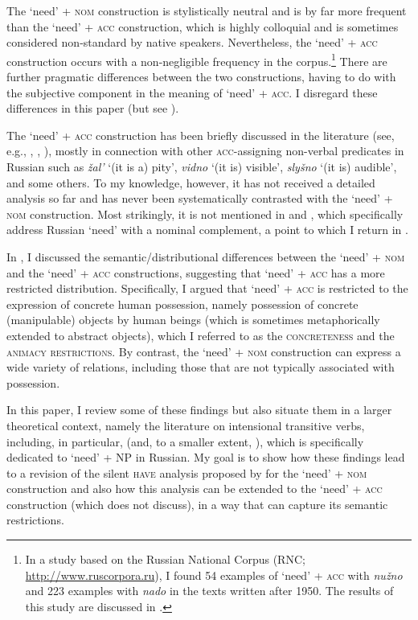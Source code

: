 \documentclass[output=paper,colorlinks,citecolor=brown]{langscibook}
\begin{document}
\noindent The `need' + \textsc{nom} construction is stylistically neutral and is by far more frequent than the `need' + \textsc{acc} construction, which is highly colloquial and is sometimes considered non-standard by native speakers. Nevertheless, the `need' + \textsc{acc} construction occurs with a non-negligible frequency in the corpus.\footnote{In a study based on the Russian National Corpus (RNC; \url{http://www.ruscorpora.ru}), I found 54 examples of `need' + \textsc{acc} with \textit{nužno} and 223 examples with \textit{nado} in the texts written after 1950. The results of this study are discussed in \citealt{Knyazev2020}.} There are further pragmatic differences between the two constructions, having to do with the subjective component in the meaning of `need' + \textsc{acc}. I disregard these differences in this paper (but see \citealt{Knyazev2020}).

The `need' + \textsc{acc} construction has been briefly discussed in the literature (see, e.g., \citealt[325--327]{Svedova1980}, \citealt[213]{Pesetsky1982}, \citealt[28]{Mikaelian.Roudet1999}), mostly in connection with other \textsc{acc}-assigning non-verbal predicates in Russian such as \textit{žal'} `(it is a) pity', \textit{vidno} `(it is) visible', \textit{slyšno} `(it is) audible', and some others. To my knowledge, however, it has not received a detailed analysis so far and has never been systematically contrasted with the `need' + \textsc{nom} construction. Most strikingly, it is not mentioned in \citet{Harves2008} and \citet{Harves.Kayne2012}, which specifically address Russian `need' with a nominal complement, a point to which I return in .

In \citet{Knyazev2020}, I discussed the semantic/distributional differences between the `need' + \textsc{nom} and the `need' + \textsc{acc} constructions, suggesting that `need' + \textsc{acc} has a more restricted distribution. Specifically, I argued that `need' + \textsc{acc} is restricted to the expression of concrete human possession, namely possession of concrete (manipulable) objects by human beings (which is sometimes metaphorically extended to abstract objects), which I referred to as the \textsc{concreteness} and the \textsc{animacy restrictions}. By contrast, the `need' + \textsc{nom} construction can express a wide variety of relations, including those that are not typically associated with possession.

In this paper, I review some of these findings but also situate them in a larger theoretical context, namely the literature on intensional transitive verbs, including, in particular, \citet{Harves2008} (and, to a smaller extent, \citealt{Harves.Kayne2012}), which is specifically dedicated to `need' + NP in Russian. My goal is to show how these findings lead to a revision of the silent \textsc{have} analysis proposed by \citet{Harves2008} for the `need' + \textsc{nom} construction and also how this analysis can be extended to the `need' + \textsc{acc} construction (which \citeauthor{Harves2008} does not discuss), in a way that can capture its semantic restrictions.
\end{document}
